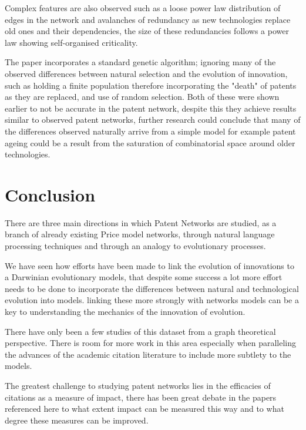 \documentclass[12pt,journal,compsoc]{IEEEtran}
\begin{document}
Complex features are also observed such as a loose power law distribution of edges in the network and avalanches of redundancy as new technologies replace old ones and their dependencies, the size of these redundancies follows a power law showing self-organised criticality. 

The paper incorporates a standard genetic algorithm; ignoring many of the observed differences between natural selection and the evolution of innovation, such as holding a finite population therefore incorporating the "death" of patents as they are replaced, and use of random selection. Both of these were shown earlier to not be accurate in the patent network, despite this they achieve results similar to observed patent networks, further research could conclude that many of the differences observed naturally arrive from a simple model for example patent ageing could be a result from the saturation of combinatorial space around older technologies.  

\section{Conclusion}
There are three main directions in which Patent Networks are studied, as a branch of already existing Price model networks, through natural language processing techniques and through an analogy to evolutionary processes. 

We have seen how efforts have been made to link the evolution of innovations to a Darwinian evolutionary models, that despite some success a lot more effort needs to be done to incorporate the differences between natural and technological evolution into models. linking these more strongly with networks models can be a key to understanding the mechanics of the innovation of evolution.

There have only been a few studies of this dataset from a graph theoretical perspective. There is room for more work in this area especially when paralleling the advances of the academic citation literature to include more subtlety to the models. 

The greatest challenge to studying patent networks lies in the efficacies of citations as a measure of impact, there has been great debate in the papers referenced here to what extent impact can be measured this way and to what degree these measures can be improved. 
\small


\end{document}

